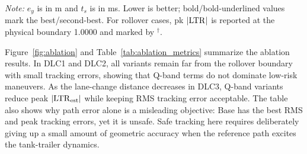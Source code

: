 \begin{table}[!htbp]
\caption{Ablation metrics}
\label{tab:ablation_metrics}
\centering
\scriptsize
\setlength{\tabcolsep}{1.2pt}
\vspace{1pt}
\parbox{\columnwidth}{\scriptsize\emph{Note:} $e_y$ is in m and $t_s$ is in ms. Lower is better; bold/bold-underlined values mark the best/second-best. For rollover cases, pk $|\mathrm{LTR}|$ is reported at the physical boundary 1.0000 and marked by $^\dagger$.}
\end{table}

Figure~\ref{fig:ablation} and Table~\ref{tab:ablation_metrics} summarize the ablation results. In DLC1 and DLC2, all variants remain far from the rollover boundary with small tracking errors, showing that Q-band terms do not dominate low-risk maneuvers. As the lane-change distance decreases in DLC3, Q-band variants reduce peak $|\mathrm{LTR}_{\mathrm{est}}|$ while keeping RMS tracking error acceptable. The table also shows why path error alone is a misleading objective: Base has the best RMS and peak tracking errors, yet it is unsafe. Safe tracking here requires deliberately giving up a small amount of geometric accuracy when the reference path excites the tank-trailer dynamics.

